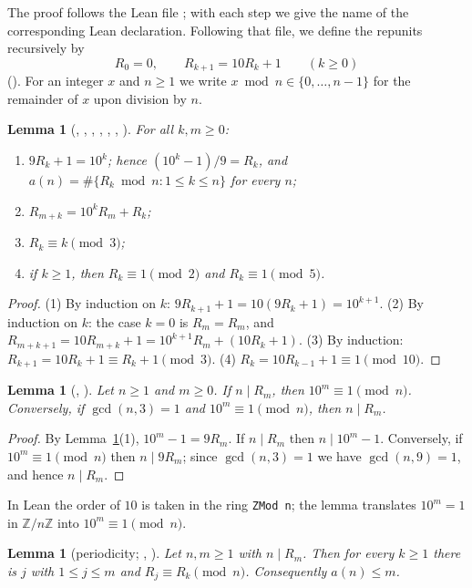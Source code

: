 \documentclass[11pt]{amsart}
\theoremstyle{plain}
\newtheorem{lemma}[theorem]{Lemma}
\theoremstyle{definition}
\newcommand{\Z}{\mathbb{Z}}
\begin{document}
The proof follows the Lean file ; with each step we give the name of the corresponding Lean declaration.
Following that file, we define the repunits recursively by
\[
  R_0=0,\qquad R_{k+1}=10R_k+1\qquad(k\ge0)
\]
(). For an integer $x$ and $n\ge1$ we write $x \bmod n\in\{0,\dots,n-1\}$ for the remainder of $x$ upon division by $n$.

\begin{lemma}[, , , , , , ]\label{lem:basic}
For all $k,m\ge0$:
\begin{enumerate}
\item $9R_k+1=10^k$; hence $(10^k-1)/9=R_k$, and $a(n)=\#\{R_k\bmod n: 1\le k\le n\}$ for every $n$;
\item $R_{m+k}=10^kR_m+R_k$;
\item $R_k\equiv k\pmod 3$;
\item if $k\ge1$, then $R_k\equiv1\pmod 2$ and $R_k\equiv 1\pmod 5$.
\end{enumerate}
\end{lemma}

\begin{proof}
(1) By induction on $k$: $9R_{k+1}+1=10(9R_k+1)=10^{k+1}$.
(2) By induction on $k$: the case $k=0$ is $R_m=R_m$, and $R_{m+k+1}=10R_{m+k}+1=10^{k+1}R_m+(10R_k+1)$.
(3) By induction: $R_{k+1}=10R_k+1\equiv R_k+1\pmod 3$.
(4) $R_k=10R_{k-1}+1\equiv1\pmod{10}$.
\end{proof}

\begin{lemma}[, ]\label{lem:div}
Let $n\ge1$ and $m\ge0$. If $n\mid R_m$, then $10^m\equiv1\pmod n$. Conversely, if $\gcd(n,3)=1$ and $10^m\equiv1\pmod n$, then $n\mid R_m$.
\end{lemma}

\begin{proof}
By Lemma~\ref{lem:basic}(1), $10^m-1=9R_m$. If $n\mid R_m$ then $n\mid 10^m-1$. Conversely, if $10^m\equiv1\pmod n$ then $n\mid 9R_m$; since $\gcd(n,3)=1$ we have $\gcd(n,9)=1$, and hence $n\mid R_m$.
\end{proof}

In Lean the order of $10$ is taken in the ring \texttt{ZMod n}; the lemma  translates $10^m=1$ in $\Z/n\Z$ into $10^m\equiv1\pmod n$.

\begin{lemma}[periodicity; , ]\label{lem:per}
Let $n,m\ge1$ with $n\mid R_m$. Then for every $k\ge1$ there is $j$ with $1\le j\le m$ and $R_j\equiv R_k\pmod n$. Consequently $a(n)\le m$.
\end{lemma}
\end{document}
